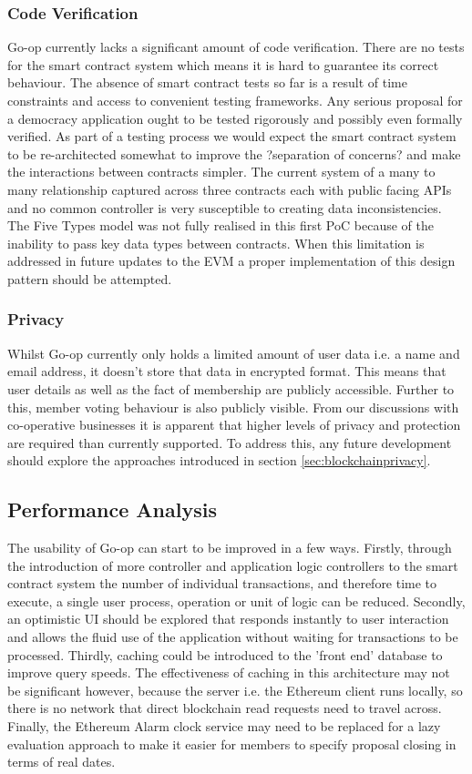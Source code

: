 \subsubsection{Code Verification}
Go-op currently lacks a significant amount of code verification. There are no tests for the smart contract system which means it is hard to guarantee its correct behaviour. The absence of smart contract tests so far is a result of time constraints and access to convenient testing frameworks. Any serious proposal for a democracy application ought to be tested rigorously and possibly even formally verified. As part of a testing process we would expect the smart contract system to be re-architected somewhat to improve the ?separation of concerns? and make the interactions between contracts simpler. The current system of a many to many relationship captured across three contracts each with public facing APIs and no common controller is very susceptible to creating data inconsistencies. The Five Types model was not fully realised in this first PoC because of the inability to pass key data types between contracts. When this limitation is addressed in future updates to the EVM a proper implementation of this design pattern should be attempted.

\subsubsection{Privacy}
Whilst Go-op currently only holds a limited amount of user data i.e. a name and email address, it doesn't store that data in encrypted format. This means that user details as well as the fact of membership are publicly accessible. Further to this, member voting behaviour is also publicly visible. From our discussions with co-operative businesses it is apparent that higher levels of privacy and protection are required than currently supported. To address this, any future development should explore the approaches introduced in section \ref{sec:blockchainprivacy}.

\subsection{Performance Analysis}
The usability of Go-op can start to be improved in a few ways. Firstly, through the introduction of more controller and application logic controllers to the smart contract system the number of individual transactions, and therefore time to execute, a single user process, operation or unit of logic can be reduced. Secondly, an optimistic UI should be explored that responds instantly to user interaction and allows the fluid use of the application without waiting for transactions to be processed. Thirdly, caching could be introduced to the 'front end' database to improve query speeds. The effectiveness of caching in this architecture may not be significant however, because the server i.e. the Ethereum client runs locally, so there is no network that direct blockchain read requests need to travel across. Finally, the Ethereum Alarm clock service may need to be replaced for a lazy evaluation approach to make it easier for members to specify proposal closing in terms of real dates.\\

